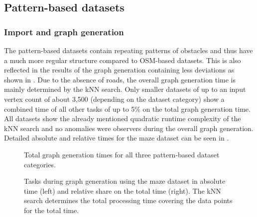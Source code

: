 	\subsection{Pattern-based datasets}
	
		\subsubsection{Import and graph generation}
		
			The pattern-based datasets contain repeating patterns of obstacles and thus have a much more regular structure compared to OSM-based datasets.
			This is also reflected in the results of the graph generation containing less deviations as shown in .
			Due to the absence of roads, the overall graph generation time is mainly determined by the kNN search.
			Only smaller datasets of up to an input vertex count of about 3,500 (depending on the dataset category) show a combined time of all other tasks of up to 5\% on the total graph generation time.
			All datasets show the already mentioned quadratic runtime complexity of the kNN search and no anomalies were observers during the overall graph generation.
			Detailed absolute and relative times for the maze dataset can be seen in .
			
			\begin{figure}[h]
				\begin{figcenter}
					
				\end{figcenter}
				\caption{Total graph generation times for all three pattern-based dataset categories.}
				\label{fig:eval-import-pattern-abs}
			\end{figure}
			
			\begin{figure}[h]
				\begin{figcenter}
					
				\end{figcenter}
				\caption[Absolute and relative graph generation time per task for the maze dataset.]{Tasks during graph generation using the maze dataset in absolute time (left) and relative share on the total time (right). The kNN search determines the total processing time covering the data points for the total time.}
				\label{fig:eval-import-pattern-maze-abs-rel}
			\end{figure}
		
